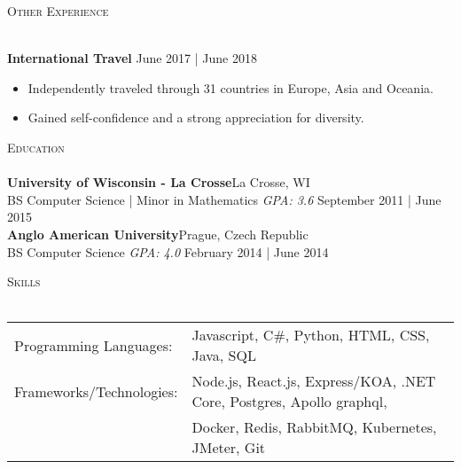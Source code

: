 \documentclass[a4paper]{article}
\newcommand{\lineunder} {
    \vspace*{-8pt} \\
    \hspace*{-18pt} \hrulefill \\
}
\newcommand{\header} [1] {
    {\hspace*{-18pt}\vspace*{6pt} \textsc{#1}}
    \vspace*{-6pt} \lineunder
}
\begin{document}
\header{Other Experience}
\vspace{1mm}

\textbf{International Travel} \hfill June 2017 | June 2018\\
\vspace{-1mm}
\begin{itemize} \itemsep 1pt
	\item Independently traveled through 31 countries in Europe, Asia and Oceania.
	\item Gained self-confidence and a strong appreciation for diversity.
\end{itemize}

\header{Education}
\textbf{University of Wisconsin - La Crosse}\hfill La Crosse, WI\\
BS Computer Science | Minor in Mathematics \textit{GPA: 3.6} \hfill September 2011 | June 2015\\
\vspace{2mm}
\textbf{Anglo American University}\hfill Prague, Czech Republic\\
BS Computer Science \textit{GPA: 4.0} \hfill February 2014 | June 2014\\
\vspace{2mm}

\header{Skills}
\begin{tabular}{ l l }
    Programming Languages: & Javascript, C\#, Python, HTML, CSS, Java, SQL              \\
	Frameworks/Technologies:            & Node.js, React.js, Express/KOA, .NET Core, Postgres, Apollo graphql, \\
	& Docker, Redis, RabbitMQ, Kubernetes, JMeter, Git \\
\end{tabular}
\vspace{2mm}
\end{document}
